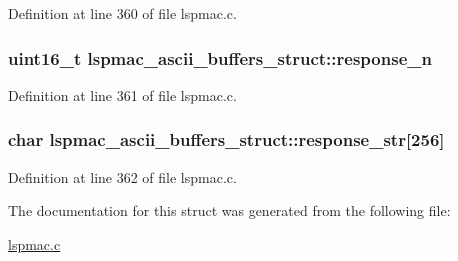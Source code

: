 Definition at line 360 of file lspmac.\-c.

\hypertarget{structlspmac__ascii__buffers__struct_a97c2fdd21eec29c2cba993e361c3c069}{
\subsubsection[{response\-\_\-n}]{\setlength{\rightskip}{0pt plus 5cm}uint16\-\_\-t lspmac\-\_\-ascii\-\_\-buffers\-\_\-struct\-::response\-\_\-n}}\label{structlspmac__ascii__buffers__struct_a97c2fdd21eec29c2cba993e361c3c069}


Definition at line 361 of file lspmac.\-c.

\hypertarget{structlspmac__ascii__buffers__struct_a32c4baecf20143eb71d348b6b5679039}{
\subsubsection[{response\-\_\-str}]{\setlength{\rightskip}{0pt plus 5cm}char lspmac\-\_\-ascii\-\_\-buffers\-\_\-struct\-::response\-\_\-str\mbox{[}256\mbox{]}}}\label{structlspmac__ascii__buffers__struct_a32c4baecf20143eb71d348b6b5679039}


Definition at line 362 of file lspmac.\-c.



The documentation for this struct was generated from the following file\-:\begin{DoxyCompactItemize}
\item 
\hyperlink{lspmac_8c}{lspmac.\-c}\end{DoxyCompactItemize}
